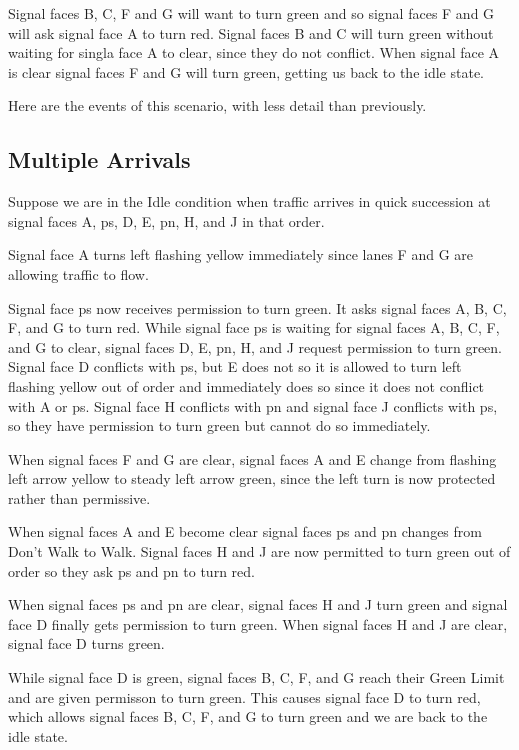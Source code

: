 \documentclass[letterpaper,twoside]{article}
\begin{document}
Signal faces B, C, F and G will want to turn green and so signal faces
F and G will ask signal face A to turn red.  Signal faces B and C
will turn green without waiting for singla face A to clear, since
they do not conflict.  When signal face A is clear signal faces
F and G will turn green, getting us back to the idle state.

Here are the events of this scenario, with less detail than
previously.



\subsection{Multiple Arrivals}

Suppose we are in the Idle condition when traffic arrives in quick succession
at signal faces A, ps, D, E, pn, H, and J in that order.

Signal face A turns left flashing yellow immediately since lanes
F and G are allowing traffic to flow.

Signal face ps now receives permission to turn green.  It asks
signal faces A, B, C, F, and G to turn red.
While signal face ps is waiting for signal faces A, B, C, F, and G to clear,
signal faces D, E, pn, H, and J request permission to turn green.
Signal face D conflicts with ps, but E does not so it is allowed to
turn left flashing yellow out of order and immediately does so
since it does not conflict with A or ps.  Signal face H conflicts
with pn and signal face J conflicts with ps, so they have permission
to turn green but cannot do so immediately.

When signal faces F and G are clear, signal faces A and E change from flashing
left arrow yellow to steady left arrow green, since the left turn is now
protected rather than permissive.

When signal faces A and E become clear signal faces ps and pn changes from
Don't Walk to Walk.  Signal faces H and J are now permitted to turn green
out of order so they ask ps and pn to turn red.

When signal faces ps and pn are clear, signal faces H and J turn green
and signal face D finally gets permission to turn green.  When signal faces
H and J are clear, signal face D turns green.

While signal face D is green, signal faces B, C, F, and G reach their
Green Limit and are given permisson to turn green.  This causes signal
face D to turn red, which allows signal faces B, C, F, and G to turn green
and we are back to the idle state.
\end{document}
